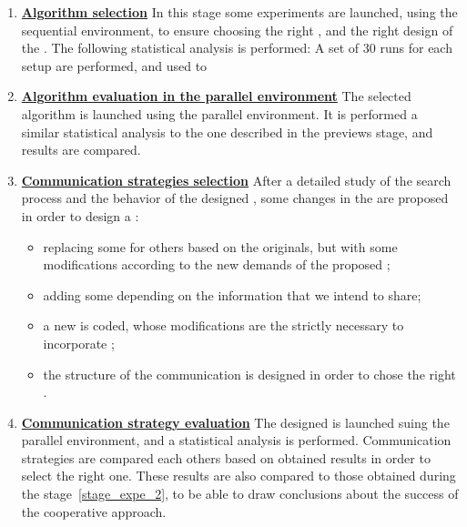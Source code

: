 \begin{enumerate}
\item \underline{\textbf{Algorithm selection}} In this stage some experiments are launched, using the sequential environment, to ensure choosing the right \oms, and the right design of the \as. The following statistical analysis is performed: A set of 30 runs for each setup are performed, and used to 

\item \underline{\textbf{Algorithm evaluation in the parallel environment}} The selected algorithm is launched using the parallel environment. It is performed a similar statistical analysis to the one described in the previews stage, and results are compared.\label{stage_expe_2}

\item \underline{\textbf{Communication strategies selection}} After a detailed study of the search process and the behavior of the designed \sosets, some changes in the \soset{} are proposed in order to design a \commstr:
\begin{itemize}
\item replacing some \oms{} for others based on the originals, but with some modifications according to the new demands of the proposed \commstr;
\item adding some \opchs{} depending on the information that we intend to share;
\item a new \as{} is coded, whose modifications are the strictly necessary to incorporate \opchs;
\item the structure of the communication is designed in order to chose the right \commopers.
\end{itemize}

\item \underline{\textbf{Communication strategy evaluation}} The designed \commstr{} is launched suing the parallel environment, and a statistical analysis is performed. Communication strategies are compared each others based on obtained results in order to select the right one. These results are also compared to those obtained during the stage~\ref{stage_expe_2}, to be able to draw conclusions about the success of the cooperative approach.
\end{enumerate}

